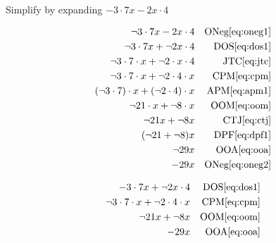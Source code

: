 \documentclass[20150903-160354-rs2.2-MarksMathNotebook.tex]{subfiles}
\begin{document}
\begin{example}[id:20141108-194431] \label{20141108-194431}  \hfill \\

Simplify by expanding $- 3\cdot 7x - 2x \cdot 4$

\soln

\solnsteps
\begin{align*}
\neg 3 \cdot 7x - 2x \cdot 4 && \text{ONeg} \eqref{eq:oneg1} \\
\neg 3 \cdot 7x +\neg 2x \cdot 4 && \text{DOS} \eqref{eq:dos1} \\
\neg 3 \cdot 7 \cdot x + \neg 2 \cdot x \cdot 4 && \text{JTC} \eqref{eq:jtc} \\
\neg 3 \cdot 7 \cdot x + \neg 2 \cdot 4 \cdot x && \text{CPM} \eqref{eq:cpm} \\
(\neg 3 \cdot 7) \cdot x + (\neg 2 \cdot 4) \cdot x && \text{APM} \eqref{eq:apm1} \\
\neg 21 \cdot x + \neg 8 \cdot x && \text{OOM} \eqref{eq:oom} \\
\neg 21 x + \neg 8 x && \text{CTJ} \eqref{eq:ctj} \\
(\neg 21 + \neg 8 )x && \text{DPF} \eqref{eq:dpf1} \\
\neg 29x && \text{OOA} \eqref{eq:ooa} \\
-29x && \text{ONeg} \eqref{eq:oneg2}
\end{align*}

\soln

\lesssteps
\begin{align*}
-3 \cdot 7x + \neg 2x \cdot 4 && \text{DOS} \eqref{eq:dos1} \\
\neg 3 \cdot 7 \cdot x + \neg 2 \cdot 4 \cdot x && \text{CPM} \eqref{eq:cpm} \\
\neg 21x + \neg 8x && \text{OOM} \eqref{eq:oom} \\
-29x && \text{OOA} \eqref{eq:ooa}
\end{align*}

\end{example}
\end{document}
